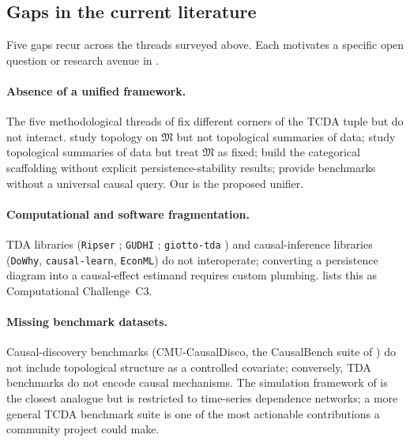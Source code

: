 \subsection{Gaps in the current literature}\label{sec:lit_gaps}

Five gaps recur across the threads surveyed above. Each motivates a
specific open question or research avenue in .

\paragraph{Absence of a unified framework.}
The five methodological threads of  fix different
corners of the TCDA tuple but do not interact. \citet{ibeling2021topological}
study topology on $\mathfrak{M}$ but not topological summaries of data;
\citet{kim2026topological} study topological summaries of data but treat
$\mathfrak{M}$ as fixed; \citet{mahadevan2025sheaf} build the
categorical scaffolding without explicit persistence-stability
results; \citet{elyaagoubi2023statistical} provide benchmarks without a
universal causal query. Our  is the proposed unifier.

\paragraph{Computational and software fragmentation.}
TDA libraries (\texttt{Ripser} \citealp{bauer2021ripser};
\texttt{GUDHI} \citealp{gudhi2021}; \texttt{giotto-tda}
\citealp{tauzin2021giotto}) and causal-inference libraries (\texttt{DoWhy},
\texttt{causal-learn}, \texttt{EconML}) do not interoperate; converting
a persistence diagram into a causal-effect estimand requires custom
plumbing.  lists this as Computational Challenge~C3.

\paragraph{Missing benchmark datasets.}
Causal-discovery benchmarks (CMU-CausalDisco, the CausalBench suite of
\citealp{causaldisco2023survey,timeseriescd2023}) do not include
topological structure as a controlled covariate; conversely,
TDA benchmarks do not encode causal mechanisms. The simulation framework
of \citet{elyaagoubi2023statistical} is the closest analogue but is
restricted to time-series dependence networks; a more general TCDA
benchmark suite is one of the most actionable contributions a community
project could make.


